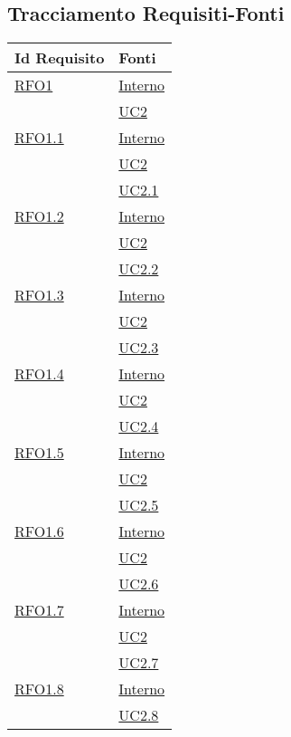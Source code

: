 \subsection{Tracciamento Requisiti-Fonti}
\normalsize
\begin{longtable}{|>{\centering}m{5cm}|m{5cm}<{\centering}|}
\hline 
\textbf{Id Requisito} & \textbf{Fonti}\\
\hline
\endhead
\hyperlink{RFO1}{RFO1} & \hyperlink{Interno}{Interno}\\
& \hyperref[UC2]{UC2}\\ \hline

\hyperlink{RFO1.1}{RFO1.1} & \hyperlink{Interno}{Interno}\\
& \hyperref[UC2]{UC2}\\
& \hyperref[UC2.1]{UC2.1}\\ \hline

\hyperlink{RFO1.2}{RFO1.2} & \hyperlink{Interno}{Interno}\\
& \hyperref[UC2]{UC2}\\
& \hyperref[UC2.2]{UC2.2}\\ \hline

\hyperlink{RFO1.3}{RFO1.3} & \hyperlink{Interno}{Interno}\\
& \hyperref[UC2]{UC2}\\
& \hyperref[UC2.3]{UC2.3}\\ \hline

\hyperlink{RFO1.4}{RFO1.4} & \hyperlink{Interno}{Interno}\\
& \hyperref[UC2]{UC2}\\
& \hyperref[UC2.4]{UC2.4}\\ \hline

\hyperlink{RFO1.5}{RFO1.5} & \hyperlink{Interno}{Interno}\\
& \hyperref[UC2]{UC2}\\
& \hyperref[UC2.5]{UC2.5}\\ \hline

\hyperlink{RFO1.6}{RFO1.6} & \hyperlink{Interno}{Interno}\\
& \hyperref[UC2]{UC2}\\
& \hyperref[UC2.6]{UC2.6}\\ \hline

\hyperlink{RFO1.7}{RFO1.7} & \hyperlink{Interno}{Interno}\\
& \hyperref[UC2]{UC2}\\
& \hyperref[UC2.7]{UC2.7}\\ \hline

\hyperlink{RFO1.8}{RFO1.8} & \hyperlink{Interno}{Interno}\\
& \hyperref[UC2.8]{UC2.8}\\ \hline


\end{longtable}
